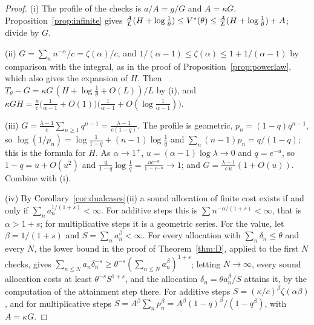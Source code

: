 \begin{proof}
(i) The profile of the checks is $a/A=g/G$ and $A=\kappa G$. Proposition~\ref{prop:infinite} gives $\frac AL(H+\log\frac1\theta)\le V^{*}(\theta)\le\frac AL(H+\log\frac1\theta)+A$; divide by $G$.

(ii) $G=\sum_{n}n^{-\alpha}/c=\zeta(\alpha)/c$, and $1/(\alpha-1)\le\zeta(\alpha)\le1+1/(\alpha-1)$ by comparison with the integral, as in the proof of Proposition~\ref{prop:powerlaw}, which also gives the expansion of $H$. Then $T_{\theta}-G=\kappa G\,(H+\log\frac1\theta+O(L))/L$ by (i), and $\kappa G H=\frac{\kappa}{c}\bigl(\frac1{\alpha-1}+O(1)\bigr)\bigl(\frac1{\alpha-1}+O(\log\frac1{\alpha-1})\bigr)$.

(iii) $G=\frac{\lambda-1}{c}\sum_{n\ge1}q^{n-1}=\frac{\lambda-1}{c(1-q)}$. The profile is geometric, $p_{n}=(1-q)q^{n-1}$, so $\log(1/p_{n})=\log\frac1{1-q}+(n-1)\log\frac1q$ and $\sum_{n}(n-1)p_{n}=q/(1-q)$; this is the formula for $H$. As $\alpha\to1^{+}$, $u=(\alpha-1)\log\lambda\to0$ and $q=e^{-u}$, so $1-q=u+O(u^{2})$ and $\frac{q}{1-q}\log\frac1q=\frac{ue^{-u}}{1-e^{-u}}\to1$; and $G=\frac{\lambda-1}{c\,u}(1+O(u))$. Combine with (i).

(iv) By Corollary~\ref{cor:dualcases}(ii) a sound allocation of finite cost exists if and only if $\sum_{n}a_{n}^{1/(1+s)}<\infty$. For additive steps this is $\sum n^{-\alpha/(1+s)}<\infty$, that is $\alpha>1+s$; for multiplicative steps it is a geometric series. For the value, let $\beta=1/(1+s)$ and $S=\sum_{n}a_{n}^{\beta}<\infty$. For every allocation with $\sum_{n}\delta_{n}\le\theta$ and every $N$, the lower bound in the proof of Theorem~\ref{thm:D}, applied to the first $N$ checks, gives $\sum_{n\le N}a_{n}\delta_{n}^{-s}\ge\theta^{-s}(\sum_{n\le N}a_{n}^{\beta})^{1+s}$; letting $N\to\infty$, every sound allocation costs at least $\theta^{-s}S^{1+s}$, and the allocation $\delta_{n}=\theta a_{n}^{\beta}/S$ attains it, by the computation of the attainment step there. For additive steps $S=(\kappa/c)^{\beta}\zeta(\alpha\beta)$, and for multiplicative steps $S=A^{\beta}\sum_{n}p_{n}^{\beta}=A^{\beta}(1-q)^{\beta}/(1-q^{\beta})$, with $A=\kappa G$.
\end{proof}

